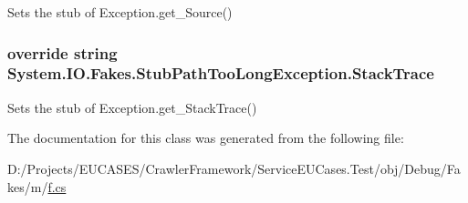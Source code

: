 Sets the stub of Exception.\-get\-\_\-\-Source()

\hypertarget{class_system_1_1_i_o_1_1_fakes_1_1_stub_path_too_long_exception_acef5dfe982faf43275445ec5680a50ab}{
\subsubsection[{Stack\-Trace}]{\setlength{\rightskip}{0pt plus 5cm}override string System.\-I\-O.\-Fakes.\-Stub\-Path\-Too\-Long\-Exception.\-Stack\-Trace\hspace{0.3cm}{\ttfamily [get]}}}\label{class_system_1_1_i_o_1_1_fakes_1_1_stub_path_too_long_exception_acef5dfe982faf43275445ec5680a50ab}


Sets the stub of Exception.\-get\-\_\-\-Stack\-Trace()



The documentation for this class was generated from the following file\-:\begin{DoxyCompactItemize}
\item 
D\-:/\-Projects/\-E\-U\-C\-A\-S\-E\-S/\-Crawler\-Framework/\-Service\-E\-U\-Cases.\-Test/obj/\-Debug/\-Fakes/m/\hyperlink{m_2f_8cs}{f.\-cs}\end{DoxyCompactItemize}
